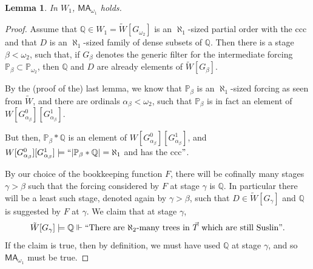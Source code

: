\documentclass[a4paper,12pt]{article}
\newtheorem{lemma}[theorem]{Lemma}
\newcommand{\forceP}{\mathbb{P}}
\newcommand{\forceQ}{\mathbb{Q}}
\newcommand{\MA}{\mathsf{MA}_{\omega_1}}
\begin{document}
\begin{lemma} In $W_1$, $\MA$ holds.
\end{lemma}
\begin{proof}
Assume that $\forceQ \in W_1=\tilde{W}[G_{\omega_2}]$ is an $\aleph_1$-sized partial order with the ccc and that $D$ is an $\aleph_1$-sized family of dense subsets of $\forceQ$. Then there is a stage $\beta < \omega_2$, such that, if $G_{\beta}$ denotes the generic filter for the intermediate forcing $\forceP_{\beta} \subset \forceP_{\omega_2}$, then $\forceQ$ and $D$ are already elements of $\tilde{W}[G_{\beta}]$. 

By the (proof of the) last lemma, we know that $\forceP_{\beta}$ is an $\aleph_1$-sized forcing as seen from $\tilde{W}$, and there are ordinals $\alpha_{\beta} < \omega_2$, such that
$\forceP_{\beta}$ is in fact an element of $W[G^0_{\alpha_{\beta}} ][G^1_{\alpha_{\beta}}]$.

But then, $\forceP_{\beta} \ast \forceQ$ is an element of $W[G^0_{\alpha_{\beta}} ][G^1_{\alpha_{\beta}}]$, and $W[G^0_{\alpha_{\beta}} ][G^1_{\alpha_{\beta}}] \models ``|\forceP_{\beta} \ast \forceQ| = \aleph_1$ and has the ccc$"$. 


By our choice of the bookkeeping function $F$, there will be cofinally many stages $\gamma> \beta$ such that the forcing considered by $F$ at stage $\gamma$ is $\forceQ$. In particular there will be a least such stage, denoted again by $\gamma > \beta$, such that $D \in \tilde{W}[G_{\gamma}]$ and $\forceQ$ is suggested by $F$ at $\gamma$. We claim that at stage $\gamma$,
\[\tilde{W}[G_{\gamma}] \models \forceQ \Vdash ``\text{There are $\aleph_2$-many trees in $\vec{T}$ which are still Suslin}". \]
If the claim is true, then by definition, we must have used $\forceQ$ at stage $\gamma$, and so $\MA$ must be true.


\end{proof}
\end{document}
